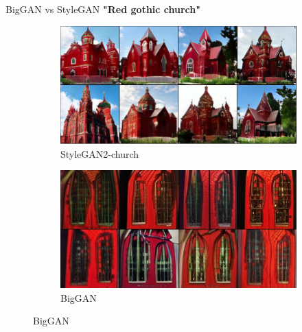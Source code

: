 \documentclass[t]{beamer}
\begin{document}
\begin{frame}[c]{BigGAN vs StyleGAN}
\centering
\textbf{"Red gothic church"}
\begin{figure}[H]
\centering
\begin{subfigure}[b]{0.5\textwidth}
   \includegraphics[width=1\linewidth, scale=0.15]{redgothic_stylegan.PNG}
   \caption{StyleGAN2-church}
   \label{fig:Ng1} 
\end{subfigure}
\begin{subfigure}[b]{0.5\textwidth}
   \includegraphics[width=1\linewidth, scale=0.15]{redgothic_biggan.PNG}
   \caption{BigGAN}
   \label{fig:Ng2}
\end{subfigure}
\end{figure}
\end{frame}
\end{document}
